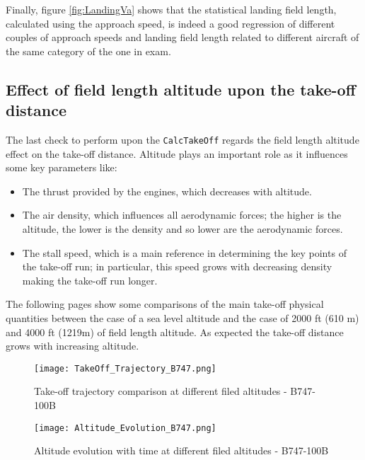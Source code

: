 \bigskip
\noindent
Finally, figure \ref{fig:LandingVa} shows that the statistical landing field length, calculated using the approach speed, is indeed a good regression of different couples of approach speeds and landing field length related to different aircraft of the same category of the one in exam.
%
\subsection{Effect of field length altitude upon the take-off distance}
%
The last check to perform upon the \lstinline[language=Java]!CalcTakeOff! regards the field length altitude effect on the take-off distance. Altitude plays an important role as it influences some key parameters like:
%
\begin{itemize}
\item The thrust provided by the engines, which decreases with altitude.
\item The air density, which influences all aerodynamic forces; the higher is the altitude, the lower is the density and so lower are the aerodynamic forces.
\item The stall speed, which is a main reference in determining the key points of the take-off run; in particular, this speed grows with decreasing density making the take-off run longer.
\end{itemize}
%
%
The following pages show some comparisons of the main take-off physical quantities between the case of a sea level altitude and the case of 2000 ft (610 m) and 4000 ft (1219m) of field length altitude. As expected the take-off distance grows with increasing altitude.
%
\clearpage
%
\begin{figure}[H]
\centering
\texttt{[image: TakeOff\_Trajectory\_B747.png]}
\caption{Take-off trajectory comparison at different filed altitudes - B747-100B}
\end{figure}
%
%
\begin{figure}[H]
\centering
\texttt{[image: Altitude\_Evolution\_B747.png]}
\caption{Altitude evolution with time at different filed altitudes - B747-100B}
\end{figure}
